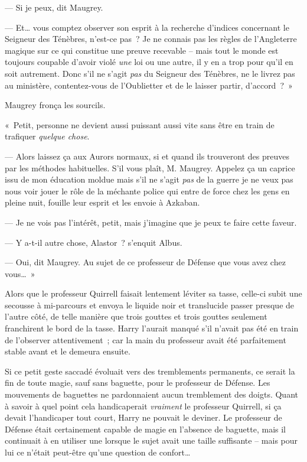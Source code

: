 --- Si je peux, dit Maugrey.

--- Et… vous comptez observer son esprit à la recherche d'indices concernant le Seigneur des Ténèbres, n'est-ce pas~?
Je ne connais pas les règles de l'Angleterre magique sur ce qui constitue une preuve recevable -- mais tout le monde est toujours coupable d'avoir violé \emph{une} loi ou une autre, il y en a trop pour qu'il en soit autrement.
Donc s'il ne s'agit \emph{pas} du Seigneur des Ténèbres, ne le livrez pas au ministère, contentez-vous de l'Oublietter et de le laisser partir, d'accord~?~»

Maugrey fronça les sourcils.

«~Petit, personne ne devient aussi puissant aussi vite sans être en train de trafiquer \emph{quelque chose}.

--- Alors laissez ça aux Aurors normaux, si et quand ils trouveront des preuves par les méthodes habituelles.
S'il vous plaît, M. Maugrey.
Appelez ça un caprice issu de mon éducation moldue mais s'il ne s'agit \emph{pas} de la guerre je ne veux pas nous voir jouer le rôle de la méchante police qui entre de force chez les gens en pleine nuit, fouille leur esprit et les envoie à Azkaban.

--- Je ne vois pas l'intérêt, petit, mais j'imagine que je peux te faire cette faveur.

--- Y a-t-il autre chose, Alastor~? s'enquit Albus.

--- Oui, dit Maugrey.
Au sujet de ce professeur de Défense que vous avez chez vous…~»



Alors que le professeur Quirrell faisait lentement léviter sa tasse, celle-ci subit une secousse à mi-parcours et envoya le liquide noir et translucide passer presque de l'autre côté, de telle manière que trois gouttes et trois gouttes seulement franchirent le bord de la tasse.
Harry l'aurait manqué s'il n'avait pas été en train de l'observer attentivement~; car la main du professeur avait été parfaitement stable avant et le demeura ensuite.

Si ce petit geste saccadé évoluait vers des tremblements permanents, ce serait la fin de toute magie, sauf sans baguette, pour le professeur de Défense.
Les mouvements de baguettes ne pardonnaient aucun tremblement des doigts.
Quant à savoir à quel point cela handicaperait \emph{vraiment} le professeur Quirrell, si ça devait l'handicaper tout court, Harry ne pouvait le deviner.
Le professeur de Défense était certainement capable de magie en l'absence de baguette, mais il continuait à en utiliser une lorsque le sujet avait une taille suffisante -- mais pour lui ce n'était peut-être qu'une question de confort…

